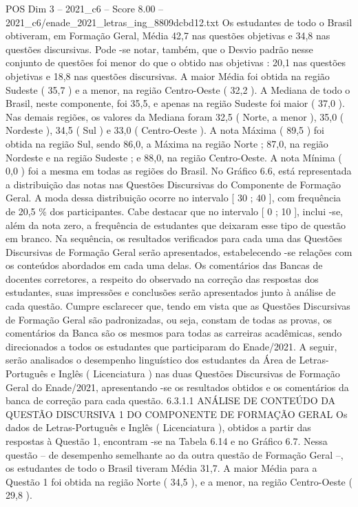 \begin{textsample}{POS Dim 3 – 2021\_c6 – Score 8.00 – 2021\_c6/enade\_2021\_letras\_ing\_8809dcbd12.txt}
Os estudantes de todo o Brasil obtiveram, em Formação Geral, Média 42,7 nas questões objetivas e 34,8 nas questões discursivas.
Pode -se notar, também, que o Desvio padrão nesse conjunto de questões foi menor do que o obtido nas objetivas : 20,1 nas questões objetivas e 18,8 nas questões discursivas.
A maior Média foi obtida na região Sudeste ( 35,7 ) e a menor, na região Centro-Oeste ( 32,2 ).
A Mediana de todo o Brasil, neste componente, foi 35,5, e apenas na região Sudeste foi maior ( 37,0 ).
Nas demais regiões, os valores da Mediana foram 32,5 ( Norte, a menor ), 35,0 ( Nordeste ), 34,5 ( Sul ) e 33,0 ( Centro-Oeste ).
A nota Máxima ( 89,5 ) foi obtida na região Sul, sendo 86,0, a Máxima na região Norte ; 87,0, na região Nordeste e na região Sudeste ; e 88,0, na região Centro-Oeste.
A nota Mínima ( 0,0 ) foi a mesma em todas as regiões do Brasil.
No Gráfico 6.6, está representada a distribuição das notas nas Questões Discursivas do Componente de Formação Geral.
A moda dessa distribuição ocorre no intervalo [ 30 ; 40 ], com frequência de 20,5 \% dos participantes.
Cabe destacar que no intervalo [ 0 ; 10 ], inclui -se, além da nota zero, a frequência de estudantes que deixaram esse tipo de questão em branco.
Na sequência, os resultados verificados para cada uma das Questões Discursivas de Formação Geral serão apresentados, estabelecendo -se relações com os conteúdos abordados em cada uma delas.
Os comentários das Bancas de docentes corretores, a respeito do observado na correção das respostas dos estudantes, suas impressões e conclusões serão apresentados junto à análise de cada questão.
Cumpre esclarecer que, tendo em vista que as Questões Discursivas de Formação Geral são padronizadas, ou seja, constam de todas as provas, os comentários da Banca são os mesmos para todas as carreiras acadêmicas, sendo direcionados a todos os estudantes que participaram do Enade/2021.
A seguir, serão analisados o desempenho linguístico dos estudantes da Área de Letras-Português e Inglês ( Licenciatura ) nas duas Questões Discursivas de Formação Geral do Enade/2021, apresentando -se os resultados obtidos e os comentários da banca de correção para cada questão. 6.3.1.1 ANÁLISE DE CONTEÚDO DA QUESTÃO DISCURSIVA 1 DO COMPONENTE DE FORMAÇÃO GERAL Os dados de Letras-Português e Inglês ( Licenciatura ), obtidos a partir das respostas à Questão 1, encontram -se na Tabela 6.14 e no Gráfico 6.7.
Nessa questão – de desempenho semelhante ao da outra questão de Formação Geral –, os estudantes de todo o Brasil tiveram Média 31,7.
A maior Média para a Questão 1 foi obtida na região Norte ( 34,5 ), e a menor, na região Centro-Oeste ( 29,8 ).

\end{textsample}
